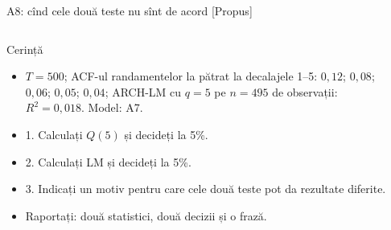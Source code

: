 \begin{frame}{A8: cînd cele două teste nu sînt de acord [Propus]}
\propsub
\itemsize{\scriptsize}
\begin{columns}[T]
\begin{column}{\taskw}
\begin{block}{Cerință}
\begin{itemize}
    \item $T = 500$; ACF-ul randamentelor la pătrat la decalajele 1--5: $0{,}12$; $0{,}08$; $0{,}06$; $0{,}05$; $0{,}04$; ARCH-LM cu $q = 5$ pe $n = 495$ de observații: $R^2 = 0{,}018$. Model: A7.
    \item 1. Calculați $Q(5)$ și decideți la 5\%.
    \item 2. Calculați LM și decideți la 5\%.
    \item 3. Indicați un motiv pentru care cele două teste pot da rezultate diferite.
    \item Raportați: două statistici, două decizii și o frază.
\end{itemize}
\end{block}
\end{column}
\begin{column}{\solw}
\end{column}
\end{columns}
\end{frame}

